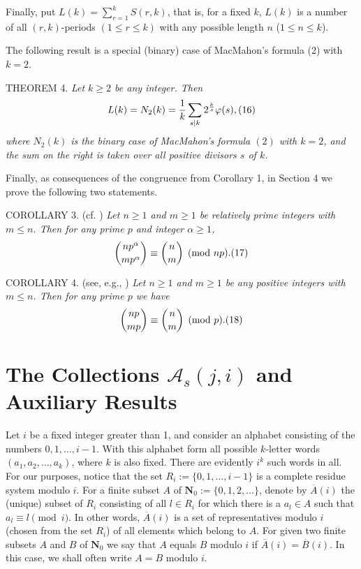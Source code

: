 \documentclass[12pt]{amsart}
\begin{document}
{\vspace{2mm}

Finally, put $L(k)=\sum_{r=1}^{k} S(r,k)$, that is, for a fixed $k$, $L(k)$ 
is a  number of all $(r,k)$-periods  $(1\le r\le k)$ 
with any possible  length $n$ ($1\le n\le k$).


The following result is a special (binary) case  
of MacMahon's formula (2) with $k=2$.

\vspace{2mm} 


T{\scriptsize HEOREM} 4. {\it  Let $k\ge 2$ be any integer. Then 
   $$
L(k)=N_2(k)=\frac{1}{k}
\sum_{s|k}2^{\frac{k}{s}}\varphi(s),\relax(16)
$$ 
where $N_2(k)$ is the binary case of MacMahon's formula $(2)$ with $k=2$, and
the sum on the right is taken over all positive divisors $s$ of $k$.}
 \vspace{2mm}


Finally, as consequences of the congruence from Corollary 1, in Section 
4 we prove the following two statements. 

\vspace{2mm}

C{\scriptsize OROLLARY} 3. (cf. \cite{m2}) {\it Let $n\ge 1$ and $m\ge 1$ be  
relatively prime integers  with $m\le n$. Then for any prime $p$ and
integer $\alpha \ge 1$,}
 $$
{np^{\alpha} \choose mp^{\alpha}}\equiv {n \choose m}\pmod{np}.\relax(17)
$$
\vspace{1mm}


C{\scriptsize OROLLARY} 4. (see, e.g.,  \cite[the congruence (5) on p. 6]{m})  {\it Let $n\ge 1$ and $m\ge 1$ be  
any positive integers  with $m\le n$. Then for any prime $p$ we have}
 $$
{np \choose mp}\equiv {n \choose m}\pmod{p}.\relax(18)
$$

\section{The Collections ${\mathcal A}_s(j,i)$ and 
Auxiliary Results}




Let $i$ be a fixed integer greater than 1, and consider an alphabet 
consisting of the numbers $0,1,\ldots,i-1$.  
With this alphabet form all possible $k$-letter words $(a_1,a_2,\ldots,a_k)$,
where $k$ is also fixed.  There are evidently $i^k$ such words in all.
For our purposes, notice that the set  $R_i:=\{0,1,\ldots,i-1\}$ is a 
complete residue system modulo $i$. 
For a finite subset $A$ of $\mathbf{N}_0:=\{0,1,2,\ldots\}$, denote by 
$\overline{A}(i)$ 
the (unique) subset of $R_i$ consisting of all 
$l\in R_i$ for which there is a $a_l\in A$ such that $a_l\equiv l  \pmod{i}$.
In other words, $\overline{A}(i)$  is a set of representatives modulo $i$
(chosen from the set $R_i$) of all elements which belong to $A$.
 For given two finite subsets $A$ and $B$ of $\mathbf{N}_0$
we say that $A$ equals $B$  modulo $i$ if $\overline{A}(i)=\overline{B}(i)$. 
In this case, we shall often write $A=B$ modulo $i$.

}
\end{document}
